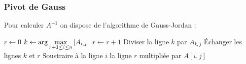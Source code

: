 \documentclass{beamercours}
\begin{document}
\begin{frame}
    \frametitle{Pivot de Gauss}
    \vspace{-5pt}
    Pour calculer $A^{-1}$ on dispose de l'algorithme de Gauss-Jordan :\vspace{-5pt}
    \begin{center}
        \scriptsize
        \begin{algorithmic}
            \State $r \gets 0$
            \State $k \gets \arg \max\limits_{r + 1 \leq i \leq n} \left|A_{i, j}\right|$
            \State $r \gets r + 1$
            \State Diviser la ligne $k$ par $A_{k, j}$
            \State Échanger les lignes $k$ et $r$
            \EndIf
            \State Soustraire à la ligne $i$ la ligne $r$ multipliée par $A[i, j]$
            \EndIf
            \EndFor
            \EndIf
            \EndFor
        \end{algorithmic}
    \end{center}
\end{frame}
\end{document}
